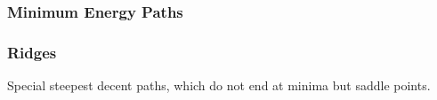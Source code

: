 \subsubsection{Minimum Energy Paths}
\label{sec:meps}

\placeholder

\subsubsection{Ridges}
\label{sec:ridges}

Special steepest decent paths, which do not end at minima but saddle points.

\placeholder

